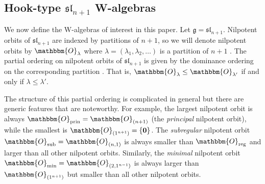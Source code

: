 \documentclass[10pt,a4paper]{amsart}
\numberwithin{equation}{section}
\DeclarePairedDelimiter{\set}{\lbrace}{\rbrace}
\newcommand{\alg}[1]{\mathfrak{#1}}  %
\newcommand{\SLA}[2]{\alg{#1}_{#2}}                      %
\newcommand{\slnpone}{\SLA{sl}{n+1}}
\newcommand{\nilorbit}[1]{\mathbbm{O}_{#1}}                                                 %
\theoremstyle{plain}
\begin{document}
\subsection{Hook-type \texorpdfstring{$\slnpone$}{sln+1} W-algebras} \label{subsec:Hook}
We now define the W-algebras of interest in this paper. Let $\mathfrak{g}=\slnpone$. Nilpotent orbits of $\slnpone$ are indexed by partitions of $n+1$, so we will denote nilpotent orbits by $\nilorbit{\lambda}$ where $\lambda=(\lambda_1, \lambda_2, \dots)$ is a partition of $n+1$ . The partial ordering on nilpotent orbits of $\slnpone$ is given by the dominance ordering on the corresponding partition \cite{Gers61}. That is, $\nilorbit{\lambda} \leq \nilorbit{\lambda'}$ if and only if $\lambda \leq \lambda'$.

The structure of this partial ordering is complicated in general but there are generic features that are noteworthy. For example, the largest nilpotent orbit is always $\nilorbit{\textup{prin}} = \nilorbit{(n+1)}$ (the \emph{principal} nilpotent orbit), while the smallest is $\nilorbit{(1^{n+1})} = \set{\mathbf{0}}$. The \emph{subregular} nilpotent orbit $\nilorbit{\textup{sub}}  = \nilorbit{(n,1)}$ is always smaller than $\nilorbit{\textup{reg}}$ and larger than all other nilpotent orbits. Similarly, the \emph{minimal} nilpotent orbit $\nilorbit{\textup{min}} = \nilorbit{(2,1^{n-1})}$ is always larger than $\nilorbit{(1^{n+1})}$ but smaller than all other nilpotent orbits. 
\end{document}
